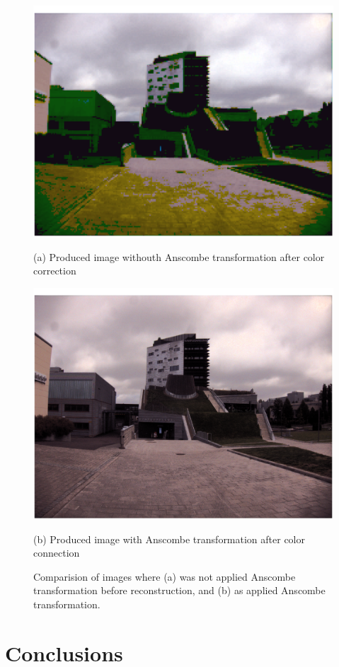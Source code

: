 \documentclass[12pt,a4paper,english
]{tunithesis}
\begin{document}
\begin{figure}[h]
  \centering
  \begin{minipage}[b]{0.45\textwidth}
    \includegraphics[width=\textwidth]{img/non-transformed-white-balance.png}
    \caption*{(a) Produced image withouth Anscombe transformation after color correction}
  \end{minipage}
  \hfill
  \begin{minipage}[b]{0.45\textwidth}
    \includegraphics[width=\textwidth]{img/transformed-white-balance.png}
    \caption*{(b) Produced image with Anscombe transformation after color connection}
  \end{minipage}
  \caption{Comparision of images where (a) was not applied Anscombe transformation before reconstruction, and (b) as applied Anscombe transformation.}
  \label{fig:comparison-white-balance}
\end{figure}


\chapter{Conclusions}
\label{ch:conclusions}
%
%
\newpage

\printbibliography[title=References]
\end{document}
